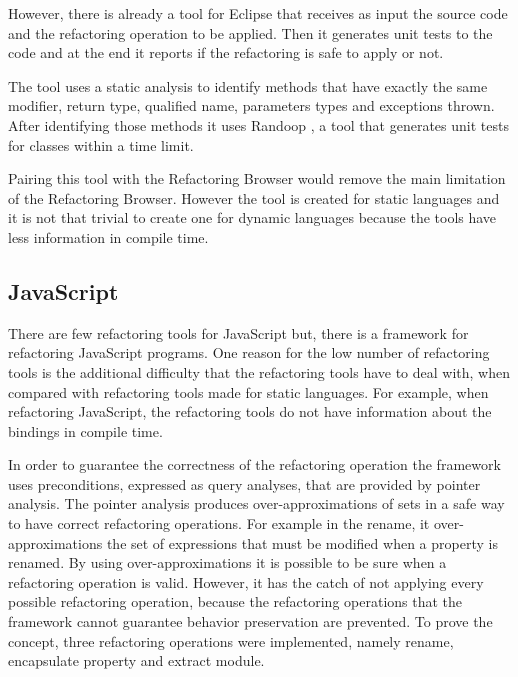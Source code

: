 %
However, there is already a tool \cite{soares2010making} for Eclipse that receives as input the source code and the refactoring operation to be applied. 
Then it generates unit tests to the code and at the end it reports if the refactoring is safe to apply or not.

The tool uses a static analysis to identify methods that have exactly the same modifier, return type, qualified name, parameters types and exceptions thrown.
After identifying those methods it uses Randoop \cite{pacheco2007feedback}, a tool that generates unit tests for classes within a time limit.

Pairing this tool with the Refactoring Browser would remove the main limitation of the Refactoring Browser.
However the tool is created for static languages and it is not that trivial to create one for dynamic languages because the tools have less information in compile time.

\subsection{JavaScript}
There are few refactoring tools for JavaScript but, there is a framework \cite{feldthaus2011tool} for refactoring JavaScript programs.
One reason for the low number of refactoring tools is the additional difficulty that the refactoring tools have to deal with, when compared with refactoring tools made for static languages. 
For example, when refactoring JavaScript, the refactoring tools do not have information about the bindings in compile time.


In order to guarantee the correctness of the refactoring operation the framework uses preconditions, expressed as query analyses, that are provided by pointer analysis.
The pointer analysis produces over-approximations of sets in a safe way to have correct refactoring operations. 
For example in the rename, it over-approximations the set of expressions that must be modified when a property is renamed.
By using over-approximations it is possible to be sure when a refactoring operation is valid. 
However, it has the catch of not applying every possible refactoring operation, because the refactoring operations that the framework cannot guarantee behavior preservation are prevented.
To prove the concept, three refactoring operations were implemented, namely rename, encapsulate property and extract module.

